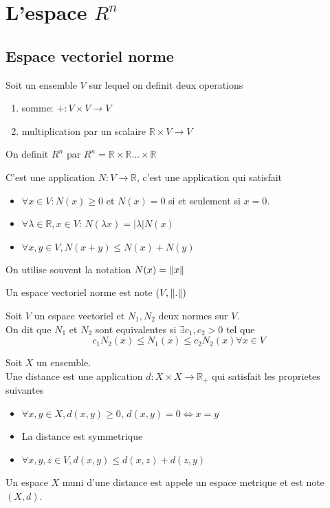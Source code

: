 \documentclass[../main.tex]{subfiles}
\begin{document}
\section{L'espace $R^{n}$}
\subsection{Espace vectoriel norme}
Soit un ensemble $V$ sur lequel on definit deux operations 
\begin{enumerate}
\item somme: $+: V \times V \to V$ 
\item multiplication par un scalaire $ \mathbb{R} \times V \to V$
\end{enumerate}
On definit $R^{n}$ par $R^{n}= \mathbb{R} \times \mathbb{R} \ldots \times \mathbb{R}$ 
\begin{defn}
	C'est une application $N:V \to \mathbb{R}$, c'est une application qui satisfait
	\begin{itemize}
		\item $\forall x \in V: N( x) \geq 0$ et $N( x) =0$ si et seulement si $x=0$.
		\item $\forall \lambda \in \mathbb{R},x \in V$: $N( \lambda x) = |\lambda | N( x) $ 
		\item $\forall x, y \in V,  N( x+y) \leq N( x) + N( y) $
	\end{itemize}
	On utilise souvent la notation $N( x) = \left\lVert x\right\rVert$
	
\end{defn}
\begin{defn}
	Un espace vectoriel norme est note $(V, \left\lVert.\right\rVert) $
\end{defn}
\begin{defn}
	Soit $V$ un espace vectoriel et $N_1, N_2$ deux normes sur $ V$.\\
	On dit que $N_1$ et $N _2$ sont equivalentes si $\exists c_1,c_2 >0$ tel que
	\[ 
		c_1 N_2( x) \leq N_1( x) \leq c_2N_2( x) \forall x \in V
	\]
	
	
\end{defn}
\begin{defn}[Distance]
	Soit $X$ un ensemble.\\
	Une distance est une application $d: X \times X \to \mathbb{R}_+$ qui satisfait les proprietes suivantes
	\begin{itemize}
		\item $\forall x,y \in X, d( x,y) \geq 0$, $d( x,y) =0 \iff x=y$ 
		\item La distance est symmetrique
		\item $\forall x,y,z \in V, d(x,y ) \leq d( x,z) + d( z,y) $
	\end{itemize}
	Un espace $X$ muni d'une distance est appele un espace metrique et est note $( X,d) $.\\

\end{defn}
\end{document}

